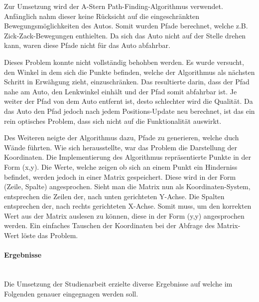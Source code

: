 \begin{enumerate}[leftmargin=*]
    Zur Umsetzung wird der A-Stern Path-Finding-Algorithmus verwendet.
    Anfänglich nahm dieser keine Rücksicht auf die eingeschränkten Bewegungsmöglichkeiten des Autos.
    Somit wurden Pfade berechnet, welche z.B. Zick-Zack-Bewegungen enthielten.
    Da sich das Auto nicht auf der Stelle drehen kann, waren diese Pfade nicht für das Auto abfahrbar.

    Dieses Problem konnte nicht vollständig behohben werden.
    Es wurde versucht, den Winkel in dem sich die Punkte befinden, welche der Algorithmus als nächsten Schritt in Erwähgung zieht, einzuschränken.
    Das resultierte darin, dass der Pfad nahe am Auto, den Lenkwinkel einhält und der Pfad somit abfahrbar ist.
    Je weiter der Pfad von dem Auto entfernt ist, desto schlechter wird die Qualität.
    Da das Auto den Pfad jedoch nach jedem Positions-Update neu berechnet, ist das ein rein optisches Problem, dass sich nicht auf die Funktionalität auswirkt.

    Des Weiteren neigte der Algorithmus dazu, Pfade zu generieren, welche duch Wände führten.
    Wie sich herausstellte, war das Problem die Darstellung der Koordinaten.
    Die Implementierung des Algorithmus repräsentierte Punkte in der Form (x,y).
    Die Werte, welche zeigen ob sich an einem Punkt ein Hinderniss befindet, werden jedoch in einer Matrix gespeichert.
    Diese wird in der Form (Zeile, Spalte) angesprochen.
    Sieht man die Matrix nun als Koordinaten-System, entsprechen die Zeilen der, nach unten gerichteten Y-Achse.
    Die Spalten entsprechen der, nach rechts gerichteten X-Achse.
    Somit muss, um den korrekten Wert aus der Matrix auslesen zu können, diese in der Form (y,y) angesprochen werden.
    Ein einfaches Tauschen der Koordinaten bei der Abfrage des Matrix-Wert löste das Problem.
\end{enumerate}

\paragraph{Ergebnisse} \mbox{}\\
Die Umsetzung der Studienarbeit erzielte diverse Ergebnisse auf welche im Folgenden genauer eingegnagen werden soll.

